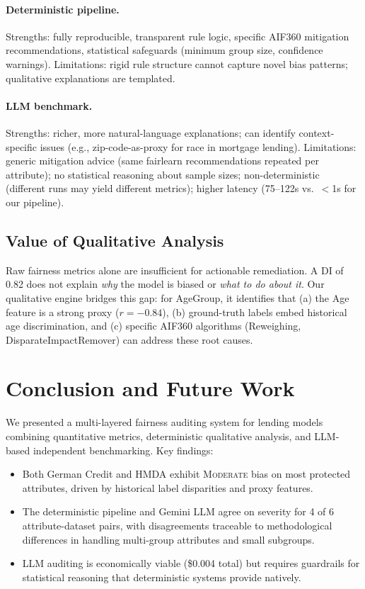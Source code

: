 \documentclass[11pt,a4paper]{article}
\begin{document}
\paragraph{Deterministic pipeline.}
Strengths: fully reproducible, transparent rule logic, specific AIF360
mitigation recommendations, statistical safeguards (minimum group size,
confidence warnings). Limitations: rigid rule structure cannot capture
novel bias patterns; qualitative explanations are templated.

\paragraph{LLM benchmark.}
Strengths: richer, more natural-language explanations; can identify
context-specific issues (e.g., zip-code-as-proxy for race in mortgage
lending). Limitations: generic mitigation advice (same fairlearn
recommendations repeated per attribute); no statistical reasoning about
sample sizes; non-deterministic (different runs may yield different
metrics); higher latency (75--122s vs.\ $<$1s for our pipeline).

\subsection{Value of Qualitative Analysis}

Raw fairness metrics alone are insufficient for actionable remediation.
A DI of 0.82 does not explain \emph{why} the model is biased or
\emph{what to do about it}. Our qualitative engine bridges this gap:
for AgeGroup, it identifies that (a) the Age feature is a strong proxy
($r{=}{-}0.84$), (b) ground-truth labels embed historical age
discrimination, and (c) specific AIF360 algorithms
(Reweighing, DisparateImpactRemover) can address these root causes.

\section{Conclusion and Future Work}

We presented a multi-layered fairness auditing system for lending models
combining quantitative metrics, deterministic qualitative analysis, and
LLM-based independent benchmarking. Key findings:
\begin{itemize}[nosep]
  \item Both German Credit and HMDA exhibit \textsc{Moderate} bias on
        most protected attributes, driven by historical label disparities
        and proxy features.
  \item The deterministic pipeline and Gemini LLM agree on severity for
        4 of 6 attribute-dataset pairs, with disagreements traceable to
        methodological differences in handling multi-group attributes and
        small subgroups.
  \item LLM auditing is economically viable (\$0.004 total) but requires
        guardrails for statistical reasoning that deterministic systems
        provide natively.
\end{itemize}
\end{document}
